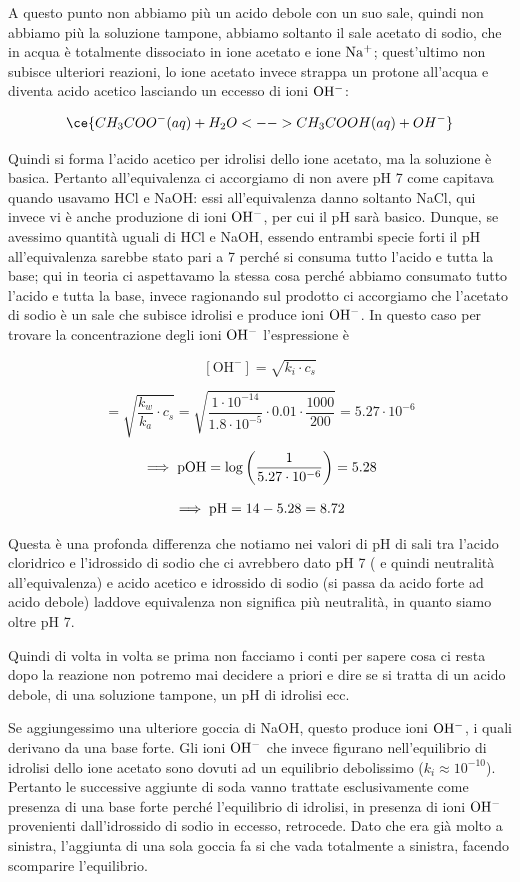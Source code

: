 A questo punto non abbiamo più un acido debole con un suo sale, quindi non abbiamo più la soluzione tampone, abbiamo soltanto il sale acetato di sodio, che in acqua è totalmente dissociato in ione acetato e ione $\rm Na^+$; quest'ultimo non subisce ulteriori reazioni, lo ione acetato invece strappa un protone all'acqua e diventa acido acetico lasciando un eccesso di ioni $\rm OH^-$:

$$\ce{CH_3COO^-(aq) + H_2O <--> CH_3COOH(aq) + OH^-}$$

Quindi si forma l'acido acetico per idrolisi dello ione acetato, ma la soluzione è basica. Pertanto all'equivalenza ci accorgiamo di non avere pH 7 come capitava quando usavamo HCl e NaOH: essi all'equivalenza danno soltanto NaCl, qui invece vi è anche produzione di ioni $\rm OH^-$, per cui il pH sarà basico. Dunque, se avessimo quantità uguali di HCl e NaOH, essendo entrambi specie forti il pH all'equivalenza sarebbe stato pari a 7 perché si consuma tutto l'acido e tutta la base; qui in teoria ci aspettavamo la stessa cosa perché abbiamo consumato tutto l'acido e tutta la base, invece ragionando sul prodotto ci accorgiamo che l'acetato di sodio è un sale che subisce idrolisi e produce ioni $\rm OH^-$. In questo caso per trovare la concentrazione degli ioni $\rm OH^-$ l'espressione è

$$[\text{OH}^-]=\sqrt{k_i \cdot c_s}$$

$$=\sqrt{\frac{k_w}{k_a} \cdot c_s}
=\sqrt{\frac{1 \cdot 10^{-14}}{1.8 \cdot 10^{-5}} \cdot 0.01 \cdot \frac{1000}{200}}=5.27 \cdot 10^{-6}$$

$$\implies \rm pOH=\log{\left(\frac{1}{5.27 \cdot 10^{-6}}\right)}=5.28$$

$$\implies \rm pH=14-5.28=8.72$$

Questa è una profonda differenza che notiamo nei valori di pH di sali tra l'acido cloridrico e l'idrossido di sodio che ci avrebbero dato pH 7 ( e quindi neutralità all'equivalenza) e acido acetico e idrossido di sodio (si passa da acido forte ad acido debole) laddove equivalenza non significa più neutralità, in quanto siamo oltre pH 7.

Quindi di volta in volta se prima non facciamo i conti per sapere cosa ci resta dopo la reazione non potremo mai decidere a priori e dire se si tratta di un acido debole, di una soluzione tampone, un pH di idrolisi ecc.

\vspace{0.2cm}Se aggiungessimo una ulteriore goccia di NaOH, questo produce ioni $\rm OH^-$, i quali derivano da una base forte. Gli ioni $\rm OH^-$ che invece figurano nell'equilibrio di idrolisi dello ione acetato sono dovuti ad un equilibrio debolissimo ($k_i \approx 10^{-10}$). Pertanto le successive aggiunte di soda vanno trattate esclusivamente come presenza di una base forte perché l'equilibrio di idrolisi, in presenza di ioni $\rm OH^-$ provenienti dall'idrossido di sodio in eccesso, retrocede. Dato che era già molto a sinistra, l'aggiunta di una sola goccia fa si che vada totalmente a sinistra, facendo scomparire l'equilibrio.

